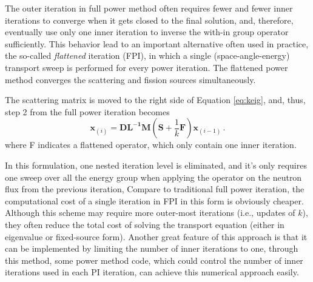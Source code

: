 The outer iteration in full power method often requires fewer and fewer inner iterations to converge when it gets closed to the final solution, and, therefore, eventually use only one inner iteration to inverse the with-in group operator sufficiently.  
This behavior lead to an important alternative often used in practice, the so-called {\it flattened} iteration (FPI), in which a single (space-angle-energy) transport sweep is performed for every power iteration.
The flattened power method converges the scattering and fission sources simultaneously.

The scattering matrix is moved to the right side of Equation \ref{eq:keig}, and, thus, step 2 from the full power iteration becomes 
\begin{equation}
 \mathbf{x}_{(i)} =  \mathbf{DL^{-1}M} (\mathbf{S} + \frac{1}{k} \mathbf{F})\mathbf{x}_{(i-1)}   \, .
 \label{eq:flatten}
\end{equation}
where F indicates a flattened operator, which only contain one inner iteration.

In this formulation, one nested iteration level is eliminated, and it's only requires one sweep over all the energy group when applying the operator on the neutron flux from the previous iteration,  
Compare to traditional full power iteration, the computational cost of a single iteration in FPI in this form is obviously cheaper.
Although this scheme may require more outer-most iterations (i.e., updates of $k$), they often reduce the total cost of solving the transport equation (either in eigenvalue  or fixed-source form).\citep{gill_newtons_2011}
Another great feature of this approach is that it can be implemented by limiting the number of inner iterations to one, through this method, some power method code, which could control the number of inner iterations used in each PI iteration, can achieve this numerical approach easily.  



